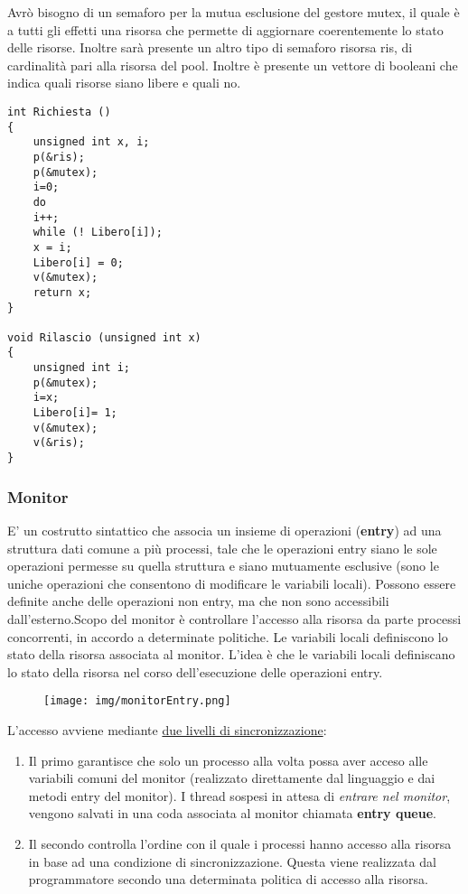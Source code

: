 \documentclass{article}
\begin{document}
\noindent Avrò bisogno di un semaforo per la mutua esclusione del gestore mutex, il quale è a tutti gli effetti una risorsa che permette di aggiornare coerentemente
lo stato delle risorse. Inoltre sarà presente un altro tipo di semaforo risorsa ris, di cardinalità pari alla risorsa del pool. Inoltre è presente un 
vettore di booleani che indica quali risorse siano libere e quali no.

\begin{lstlisting}[style=CStyle]
int Richiesta ()
{ 
    unsigned int x, i;
    p(&ris);
    p(&mutex);
    i=0;
    do
    i++;
    while (! Libero[i]);
    x = i;
    Libero[i] = 0;
    v(&mutex);
    return x;
}

void Rilascio (unsigned int x)
{ 
    unsigned int i;
    p(&mutex);
    i=x;
    Libero[i]= 1;
    v(&mutex);
    v(&ris);
}
\end{lstlisting}

\subsubsection{Monitor}
\noindent E' un costrutto sintattico che associa un insieme di operazioni (\textbf{entry}) ad una struttura dati comune a più processi,
tale che le operazioni entry siano le sole operazioni permesse su quella struttura e siano mutuamente esclusive (sono le uniche operazioni
 che consentono di modificare le variabili locali). Possono essere definite anche delle operazioni non entry, ma che non sono accessibili
 dall'esterno.Scopo del monitor è controllare l'accesso alla risorsa da parte processi concorrenti, in accordo a determinate
 politiche. Le variabili locali definiscono lo stato della risorsa associata al monitor. L'idea è che le variabili locali definiscano 
 lo stato della risorsa nel corso dell'esecuzione delle operazioni entry.

 \begin{figure}[h!]
    \begin{center}
        \texttt{[image: img/monitorEntry.png]}     
    \end{center}
\end{figure}

\noindent L'accesso avviene mediante \underline{due livelli di sincronizzazione}:
\begin{enumerate}
    \item Il primo garantisce che solo un processo alla volta possa aver acceso alle variabili comuni del monitor 
    (realizzato direttamente dal linguaggio e dai metodi entry del monitor). I thread sospesi in attesa di \textit{entrare nel monitor},
    vengono salvati in una coda associata al monitor chiamata \textbf{entry queue}.
    \item Il secondo controlla l'ordine con il quale i processi hanno accesso alla risorsa in base ad una condizione 
    di sincronizzazione. Questa viene realizzata dal programmatore secondo una determinata politica di accesso alla risorsa.
\end{enumerate}
\end{document}
